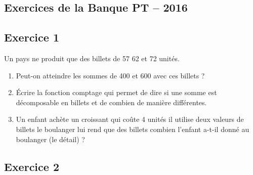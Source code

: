 \documentclass[10pt,fleqn]{article} %
\begin{document}
\newpage 
\begin{multicols}{2}
\section{Exercices de la Banque PT -- 2016}
\subsection*{Exercice 1}

Un pays ne produit que des billets de 57 62 et 72 unités.
\begin{enumerate}
\item Peut-on atteindre les sommes de 400 et 600 avec ces billets ?
\item Écrire la fonction comptage qui permet de dire si une somme est décomposable en billets et de combien de manière différentes. 
\item Un enfant achète un croissant qui coûte 4 unités il utilise deux valeurs de billets le boulanger lui rend que des billets combien l'enfant a-t-il donné au boulanger (le détail) ?
\end{enumerate}

\end{multicols}

\subsection*{Exercice 2}
\end{document}

